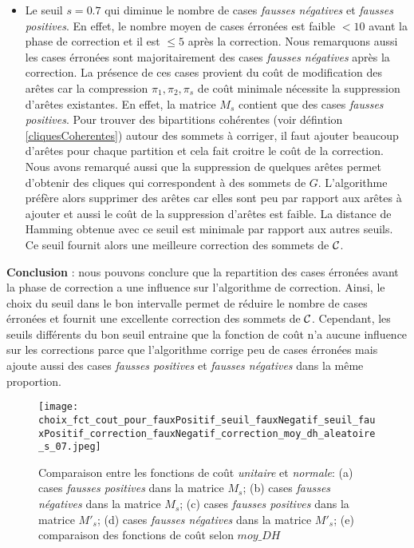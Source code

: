 \begin{itemize}
	\item Le seuil $s=0.7$ qui diminue le nombre de cases {\em fausses n\'egatives} et {\em fausses positives}. En effet, le nombre moyen de cases \'erron\'ees est faible $< 10$ avant la phase de correction et il est $ \le 5$ apr\`es la correction. Nous remarquons aussi les cases \'erron\'ees sont majoritairement des cases {\em fausses n\'egatives} apr\`es la correction.
	La pr\'esence de ces cases provient du co\^ut de modification des ar\^etes car la compression $\pi_1,\pi_2, \pi_s$ de co\^ut minimale n\'ecessite la suppression d'ar\^etes existantes.
	En effet, la matrice $M_s$ contient que des cases {\em fausses positives}. Pour trouver des bipartitions coh\'erentes (voir d\'efintion \ref{cliquesCoherentes}) autour des sommets \`a corriger, il faut ajouter beaucoup d'ar\^etes pour chaque partition et cela fait croitre le co\^ut de la correction. 
	Nous avons remarqu\'e aussi que la suppression de quelques ar\^etes permet d'obtenir des cliques qui correspondent \`a des sommets de $G$. L'algorithme pr\'ef\`ere alors supprimer des ar\^etes car elles sont peu par rapport aux ar\^etes \`a ajouter et aussi le co\^ut de la suppression d'ar\^etes est faible.
	 La distance de Hamming obtenue avec ce seuil est minimale par rapport aux autres seuils. Ce seuil fournit alors une meilleure correction des sommets de ${\cal C}$. 
	
\end{itemize}

{\bf Conclusion} : 
nous pouvons conclure que la repartition des cases \'erron\'ees avant la phase de correction a une influence sur l'algorithme de correction. 
Ainsi, le choix du seuil dans le bon intervalle permet de r\'eduire le nombre de cases \'erron\'ees et fournit une excellente correction des sommets de ${\cal C}$. 
Cependant,  les seuils diff\'erents du bon seuil  entraine que la fonction de co\^ut n'a aucune influence sur les corrections parce que l'algorithme corrige peu de cases \'erron\'ees mais ajoute aussi des cases {\em fausses positives} et {\em fausses n\'egatives} dans la m\^eme proportion. 

\begin{figure}[htb!] 
\centering
\texttt{[image: choix\_fct\_cout\_pour\_fauxPositif\_seuil\_fauxNegatif\_seuil\_fauxPositif\_correction\_fauxNegatif\_correction\_moy\_dh\_aleatoire\_s\_07.jpeg]}
\caption{ Comparaison entre les fonctions de co\^ut {\em unitaire} et {\em normale}: (a) cases {\em fausses positives} dans la matrice $M_s$; (b) cases {\em fausses n\'egatives} dans la matrice $M_s$; (c) cases {\em fausses positives} dans la matrice $M'_s$; (d) cases {\em fausses n\'egatives} dans la matrice $M'_s$; (e) comparaison des fonctions de co\^ut selon $moy\_DH$}
\label{comparaisonFctCoutUnitaireNormale} 
\end{figure}
 \FloatBarrier


